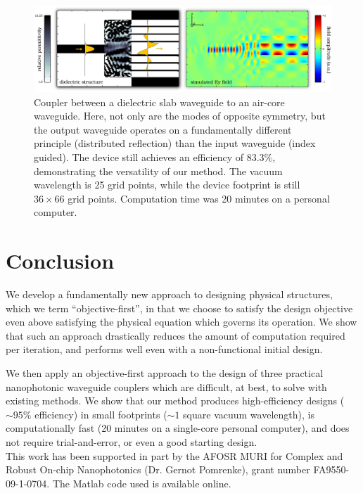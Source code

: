 \documentclass[letterpaper,10pt]{article}
\begin{document}
\begin{figure}[htbp]
    \centering
    \includegraphics[width=\textwidth]{air-core}
    \caption{Coupler between a dielectric slab waveguide to 
        an air-core waveguide.
        Here, not only are the modes of opposite symmetry,
        but the output waveguide operates on a fundamentally different
        principle (distributed reflection) than the input waveguide 
        (index guided).
        The device still achieves an efficiency of $83.3\%$, demonstrating the
        versatility of our method.
        The vacuum wavelength is 25 grid points, 
        while the device footprint is still $36 \times 66$ grid points.
        Computation time was 20 minutes on a personal computer.
        }
        \label{fig:aircore}
\end{figure}

\section{Conclusion}
We develop a fundamentally new approach to designing physical structures,
    which we term ``objective-first'', 
    in that we choose to satisfy the design objective 
    even above satisfying the physical equation which governs its operation.
We show that such an approach drastically reduces the
    amount of computation required per iteration, and 
    performs well even with a non-functional initial design.

We then apply an objective-first approach to the design of 
    three practical nanophotonic waveguide couplers which are difficult, 
    at best, to solve with existing methods. 
We show that our method produces
    high-efficiency designs ($\sim 95\%$ efficiency) 
    in small footprints ($\sim 1$ square vacuum wavelength),
    is computationally fast (20 minutes on a single-core personal computer), and
    does not require trial-and-error, or even 
    a good starting design.\\


This work has been supported in part by the 
    AFOSR MURI for Complex and Robust On-chip Nanophotonics 
    (Dr. Gernot Pomrenke), grant number FA9550-09-1-0704.
The Matlab code used is available online\cite{code}.
\end{document}
